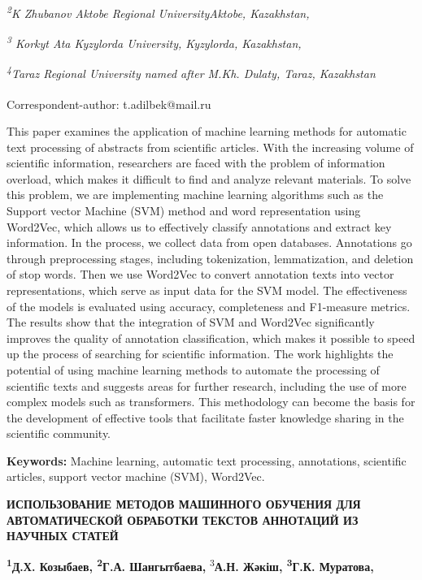 \emph{\textsuperscript{2}K Zhubanov Aktobe Regional UniversityAktobe,
Kazakhstan,}

\emph{\textsuperscript{3} Korkyt Ata Kyzylorda University, Kyzylorda,
Kazakhstan,}

\emph{\textsuperscript{4}Taraz Regional University named after M.Kh.
Dulaty, Taraz, Kazakhstan}

{\bfseries \textsuperscript{\envelope }}Correspondent-author: t.adilbek@mail.ru

This paper examines the application of machine learning methods for
automatic text processing of abstracts from scientific articles. With
the increasing volume of scientific information, researchers are faced
with the problem of information overload, which makes it difficult to
find and analyze relevant materials. To solve this problem, we are
implementing machine learning algorithms such as the Support vector
Machine (SVM) method and word representation using Word2Vec, which
allows us to effectively classify annotations and extract key
information. In the process, we collect data from open databases.
Annotations go through preprocessing stages, including tokenization,
lemmatization, and deletion of stop words. Then we use Word2Vec to
convert annotation texts into vector representations, which serve as
input data for the SVM model. The effectiveness of the models is
evaluated using accuracy, completeness and F1-measure metrics. The
results show that the integration of SVM and Word2Vec significantly
improves the quality of annotation classification, which makes it
possible to speed up the process of searching for scientific
information. The work highlights the potential of using machine learning
methods to automate the processing of scientific texts and suggests
areas for further research, including the use of more complex models
such as transformers. This methodology can become the basis for the
development of effective tools that facilitate faster knowledge sharing
in the scientific community.

{\bfseries Keywords:} Machine learning, automatic text processing,
annotations, scientific articles, support vector machine (SVM),
Word2Vec.

{\bfseries ИСПОЛЬЗОВАНИЕ МЕТОДОВ МАШИННОГО ОБУЧЕНИЯ ДЛЯ АВТОМАТИЧЕСКОЙ
ОБРАБОТКИ ТЕКСТОВ АННОТАЦИЙ ИЗ НАУЧНЫХ СТАТЕЙ}

{\bfseries \textsuperscript{1}Д.Х. Козыбаев, \textsuperscript{2}Г.А.
Шангытбаева,} \textsuperscript{3}{\bfseries А.Н. Жәкіш,
\textsuperscript{3}Г.К. Муратова,}

